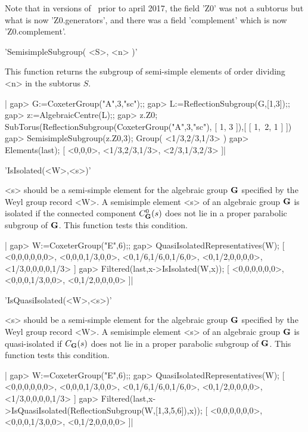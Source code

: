 Note  that in versions of \CHEVIE\ prior  to april 2017, the field 'Z0' was
not a  subtorus  but  what  is  now  'Z0.generators', and there was a field
'complement' which is now 'Z0.complement'.


'SemisimpleSubgroup( <S>, <n> )'

This  function  returns  the  subgroup  of  semi-simple  elements  of order
dividing  <n>  in  the  subtorus  $S$.

|    gap> G:=CoxeterGroup("A",3,"sc");;
    gap> L:=ReflectionSubgroup(G,[1,3]);;
    gap> z:=AlgebraicCentre(L);;
    gap> z.Z0;
    SubTorus(ReflectionSubgroup(CoxeterGroup("A",3,"sc"), [ 1, 3 ]),[ [ 1,\
     2, 1 ] ])
    gap> SemisimpleSubgroup(z.Z0,3);
    Group( <1/3,2/3,1/3> )
    gap> Elements(last);
    [ <0,0,0>, <1/3,2/3,1/3>, <2/3,1/3,2/3> ]|

\Section{IsIsolated}

'IsIsolated(<W>,<s>)'

<s> should be a semi-simple element for the algebraic group ${\mathbf G}$ specified
by  the Weyl  group record  <W>. A  semisimple element  <s> of an algebraic
group  ${\mathbf G}$ is isolated  if the connected  component $C_{\mathbf G}^0(s)$ does not
lie  in  a  proper  parabolic  subgroup  of ${\mathbf G}$. This function tests this
condition.

|    gap> W:=CoxeterGroup("E",6);;
    gap> QuasiIsolatedRepresentatives(W);
    [ <0,0,0,0,0,0>, <0,0,0,1/3,0,0>, <0,1/6,1/6,0,1/6,0>,
      <0,1/2,0,0,0,0>, <1/3,0,0,0,0,1/3> ]
    gap> Filtered(last,x->IsIsolated(W,x));
    [ <0,0,0,0,0,0>, <0,0,0,1/3,0,0>, <0,1/2,0,0,0,0> ]|

\Section{IsQuasiIsolated}

'IsQuasiIsolated(<W>,<s>)'

<s> should be a semi-simple element for the algebraic group ${\mathbf G}$ specified
by  the Weyl  group record  <W>. A  semisimple element  <s> of an algebraic
group  ${\mathbf G}$  is  quasi-isolated  if  $C_{\mathbf G}(s)$  does  not lie in a proper
parabolic subgroup of ${\mathbf G}$. This function tests this condition.

|    gap> W:=CoxeterGroup("E",6);;
    gap> QuasiIsolatedRepresentatives(W);
    [ <0,0,0,0,0,0>, <0,0,0,1/3,0,0>, <0,1/6,1/6,0,1/6,0>,
      <0,1/2,0,0,0,0>, <1/3,0,0,0,0,1/3> ]
    gap> Filtered(last,x->IsQuasiIsolated(ReflectionSubgroup(W,[1,3,5,6]),x));
    [ <0,0,0,0,0,0>, <0,0,0,1/3,0,0>, <0,1/2,0,0,0,0> ]|

